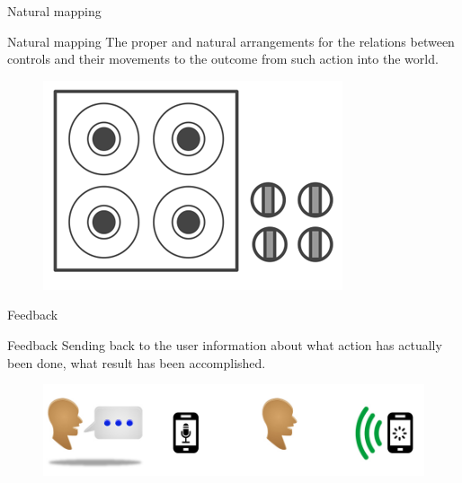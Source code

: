 \documentclass{beamer}
\begin{document}
\begin{frame}{Natural mapping}
	\begin{block}{Natural mapping}
	The proper and natural arrangements for the relations between controls and their 	movements to the outcome from such action into the world. 
	\end{block}
	\begin{figure}[ht]
	\includegraphics[scale=0.3]{stove_natural.png}
	\end{figure}
	\end{frame}

\begin{frame}{Feedback}
	\begin{block}{Feedback}
	Sending back to the user information about what action has actually been done, what result has been accomplished.
	\end{block}
	\begin{figure}[ht]
	\includegraphics[scale=0.3]{retro-action-speaking.jpg}
	\end{figure}
\end{frame}
\end{document}
